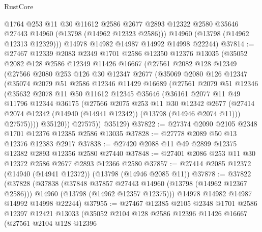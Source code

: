 \begin{lexlean}{RustCore}
\begin{coremodule}
          @1764
          @253
          @11
          @30
          @11612
          @2586
          @2677
          @2893
          @12322
          @2580
          @35646
          @27443
          @14960
          (@13798 (@14962 @12323 @2586)))
        @14960
        (@13798 (@14962 @12313 @12329)))
      @14978
      @14982
      @14987
      @14992
      @14998
      @22244)
@37814 := @27467
    @12339
    @2083
    @2349
    @1701
    @2586
    @12350
    @12376
    @13035
    (@35052
      @2082
      @128
      @2586
      @12349
      @11426
      @16667
      (@27561
        @2082
        @128
        @12349
        (@27566
          @2080
          @253
          @126
          @30
          @12347
          @2677
          (@35069
            @2080
            @126
            @12347
            (@35074
              @2079
              @51
              @2586
              @12346
              @11429
              @16689
              (@27561
                @2079
                @51
                @12346
                (@35632
                  @2078
                  @11
                  @50
                  @11612
                  @12345
                  @35646
                  (@36161
                    @2077
                    @11
                    @49
                    @11796
                    @12344
                    @36175
                    (@27566
                      @2075
                      @253
                      @11
                      @30
                      @12342
                      @2677
                      (@27414 @2074 @12342 (@14940 (@14941 @12342)) (@13798 (@14946 @2074 @11)))
                      @27575))))
              @35120))
          @27575))
      @35129)
@37822 := @27374 @2090 @2105 @2348 @1701 @12376 @12385 @2586 @13035
@37828 := @27778 @2089 @50 @13 @12376 @12383 @2917
@37838 := @27420 @2088 @11 @49 @2899 @12375 @12382 @2893 @12356 @2580 @27440
@37848 := @27401 @2086 @253 @11 @30 @12372 @2586 @2677 @2893 @12366 @2580
@37857 := @27414 @2085 @12372 (@14940 (@14941 @12372)) (@13798 (@14946 @2085 @11))
@37878 := @37822
    (@37828
      (@37838
        (@37848 @37857 @27443 @14960 (@13798 (@14962 @12367 @2586)))
        @14960
        (@13798 (@14962 @12357 @12375)))
      @14978
      @14982
      @14987
      @14992
      @14998
      @22244)
@37955 := @27467
    @12385
    @2105
    @2348
    @1701
    @2586
    @12397
    @12421
    @13033
    (@35052
      @2104
      @128
      @2586
      @12396
      @11426
      @16667
      (@27561
        @2104
        @128
        @12396

\end{coremodule}
\end{lexlean}

